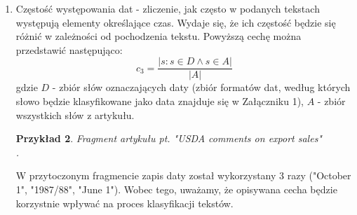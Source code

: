 \documentclass{classrep}
\newtheorem{exmp}{Przykład}[section]
\begin{document}
\begin{enumerate}
    \begin{exmp}Fragment artykułu pt. "Maxtor agrees to acquire U.S. design" \cite{reuters}\\ 
    . \\
    \end{exmp}
    W powyższym fragmencie została wymieniona waluta o nazwie dolar ("dlrs"). Mimo, że najbardziej popularnym dolarem jest dolar amerykański, natomiast na świecie jest jeszcze wiele innych walut, których pierwszym członem jest słowo "dolar", np. dolar kanadyjski, dolar australijski. Ten fakt należy również wziąć pod uwagę w momencie wyznaczania zbiorów rozmytych. Z podanego fragmentu wynika także, że aby w pełni skorzystać z tej cechy, należy uwzględnić nie tylko pełne nazwy walut, ale również ich skróty, które również się pojawiają w artykułach. \\
    \item Częstość występowania dat - zliczenie, jak często w podanych tekstach występują elementy określające czas. Wydaje się, że ich częstość będzie się różnić w zależności od pochodzenia tekstu. Powyższą cechę można przedstawić następująco:
    \begin{equation}
        c_3 = \frac{|{s: s \in D \land s \in A}|}{|A|}
    \end{equation}
    gdzie $D$ - zbiór słów oznaczających daty (zbiór formatów dat, według których słowo będzie klasyfikowane jako data znajduje się w Załączniku 1), $A$ - zbiór wszystkich słów z artykułu. \\
    \begin{exmp} Fragment artykułu pt. "USDA comments on export sales"  \cite{reuters} \\
    . \\
    \end{exmp}W przytoczonym fragmencie zapis daty został wykorzystany 3 razy ("October 1", "1987/88", "June 1"). Wobec tego, uważamy, że opisywana cecha będzie korzystnie wpływać na proces klasyfikacji tekstów. \\


\end{enumerate}
\end{document}
